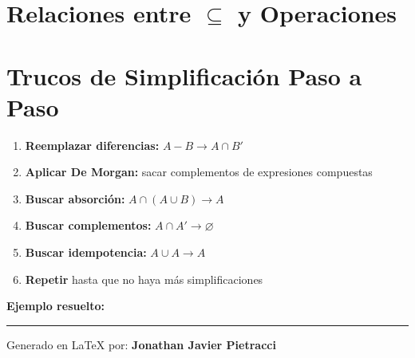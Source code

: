 \documentclass[11pt,a4paper]{article}
\begin{document}
\vspace{1em}

\section{Relaciones entre $\subseteq$ y Operaciones}

\begin{center}
\end{center}

\vspace{1em}

\section{Trucos de Simplificación Paso a Paso}

\begin{enumerate}[leftmargin=*, itemsep=0.5em]
  \item \textbf{Reemplazar diferencias:} $A - B \to A \cap B'$
  \item \textbf{Aplicar De Morgan:} sacar complementos de expresiones compuestas
  \item \textbf{Buscar absorción:} $A \cap (A \cup B) \to A$
  \item \textbf{Buscar complementos:} $A \cap A' \to \varnothing$
  \item \textbf{Buscar idempotencia:} $A \cup A \to A$
  \item \textbf{Repetir} hasta que no haya más simplificaciones
\end{enumerate}

\vspace{1em}

\textbf{Ejemplo resuelto:}

\begin{center}
\end{center}

\vfill
\begin{center}
\rule{0.8\textwidth}{0.4pt}

\vspace{0.5em}
Generado en \LaTeX{} por: \textbf{Jonathan Javier Pietracci}
\end{center}
\end{document}
